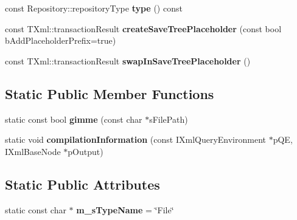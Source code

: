 \begin{DoxyCompactItemize}
\item 
\hypertarget{classgeneral__server_1_1File_a4db4849378821e3afdb59c03b02d53d4}{const \-Repository\-::repository\-Type {\bfseries type} () const }\label{classgeneral__server_1_1File_a4db4849378821e3afdb59c03b02d53d4}

\item 
\hypertarget{classgeneral__server_1_1File_a019a5c9cb0732e83e89e825c8172b475}{const \-T\-Xml\-::transaction\-Result {\bfseries create\-Save\-Tree\-Placeholder} (const bool b\-Add\-Placeholder\-Prefix=true)}\label{classgeneral__server_1_1File_a019a5c9cb0732e83e89e825c8172b475}

\item 
\hypertarget{classgeneral__server_1_1File_a148ef8d0071439cf8a76f1519a9862eb}{const \-T\-Xml\-::transaction\-Result {\bfseries swap\-In\-Save\-Tree\-Placeholder} ()}\label{classgeneral__server_1_1File_a148ef8d0071439cf8a76f1519a9862eb}

\end{DoxyCompactItemize}
\subsection*{\-Static \-Public \-Member \-Functions}
\begin{DoxyCompactItemize}
\item 
\hypertarget{classgeneral__server_1_1File_a077ecb65923583802054dd639ed93f88}{static const bool {\bfseries gimme} (const char $\ast$s\-File\-Path)}\label{classgeneral__server_1_1File_a077ecb65923583802054dd639ed93f88}

\item 
\hypertarget{classgeneral__server_1_1File_ac87dfe8bed5076bcfd2191754355068b}{static void {\bfseries compilation\-Information} (const \-I\-Xml\-Query\-Environment $\ast$p\-Q\-E, \-I\-Xml\-Base\-Node $\ast$p\-Output)}\label{classgeneral__server_1_1File_ac87dfe8bed5076bcfd2191754355068b}

\end{DoxyCompactItemize}
\subsection*{\-Static \-Public \-Attributes}
\begin{DoxyCompactItemize}
\item 
\hypertarget{classgeneral__server_1_1File_aa83dcf1be85523291274a7a4945247fd}{static const char $\ast$ {\bfseries m\-\_\-s\-Type\-Name} = \char`\"{}\-File\char`\"{}}\label{classgeneral__server_1_1File_aa83dcf1be85523291274a7a4945247fd}

\end{DoxyCompactItemize}
